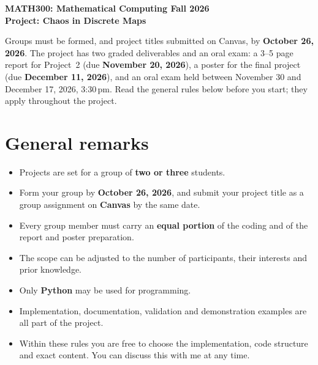\documentclass[11pt,a4paper]{article}
\begin{document}
\begin{center}
  {\large\bfseries MATH300: Mathematical Computing \textperiodcentered{} Fall 2026}\\[6pt]
  {\Large\bfseries Project: Chaos in Discrete Maps}
\end{center}
\vspace{6pt}

Groups must be formed, and project titles submitted on Canvas, by
\textbf{October 26, 2026}. The project
has two graded deliverables and an oral exam: a 3--5 page report for
Project~2 (due \textbf{November 20, 2026}), a poster for the final project
(due \textbf{December 11, 2026}), and an oral exam held between November 30
and December 17, 2026, 3:30\,pm. Read the general rules below before you
start; they apply throughout the project.

\section*{General remarks}
\begin{itemize}
  \item Projects are set for a group of \textbf{two or three} students.
  \item Form your group by \textbf{October 26, 2026}, and submit your
        project title as a group assignment on \textbf{Canvas} by the same
        date.
  \item Every group member must carry an \textbf{equal portion} of the coding
        and of the report and poster preparation.
  \item The scope can be adjusted to the number of participants, their
        interests and prior knowledge.
  \item Only \textbf{Python} may be used for programming.
  \item Implementation, documentation, validation and demonstration examples
        are all part of the project.
  \item Within these rules you are free to choose the implementation, code
        structure and exact content. You can discuss this with me at any time.
\end{itemize}
\end{document}
